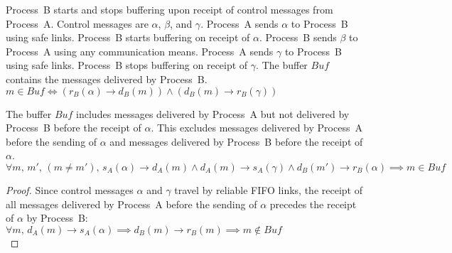 \begin{definition}
  Process~B starts and stops buffering upon receipt of control messages from
  Process~A. Control messages are $\alpha$, $\beta$, and $\gamma$. Process~A
  sends $\alpha$ to Process~B using safe links. Process~B starts buffering on
  receipt of $\alpha$. Process~B sends $\beta$ to Process~A using any
  communication means. Process~A sends $\gamma$ to Process~B using safe
  links. Process~B stops buffering on receipt of $\gamma$.
  The buffer $Buf$ contains the messages delivered by Process~B. \\
  $m \in Buf \Longleftrightarrow 
  (r_B(\alpha) \rightarrow d_B(m)) \wedge (d_B(m) \rightarrow r_B(\gamma))$
\end{definition}

\begin{lemma}
  The buffer $Buf$ includes messages delivered by Process~A but not delivered by
  Process~B before the receipt of $\alpha$. This excludes messages delivered by
  Process~A before the sending of $\alpha$ and messages delivered by Process~B
  before the receipt of $\alpha$.\\
  $\forall m,\,m',\,(m\neq m'),\,
  s_A(\alpha) \rightarrow d_A(m) \wedge
  d_A(m) \rightarrow s_A(\gamma) \wedge
  d_B(m') \rightarrow r_B(\alpha) \implies m \in Buf$
\end{lemma}

\begin{proof}
  Since control messages $\alpha$ and $\gamma$ travel by reliable FIFO links,
  the receipt of all messages delivered by Process~A before the sending of
  $\alpha$ precedes the receipt of $\alpha$ by Process~B:\\
  $\forall m,\, d_A(m) \rightarrow s_A(\alpha) \implies d_B(m) \rightarrow
  r_B(m) \implies m \not\in Buf$\\
\end{proof}

%     

